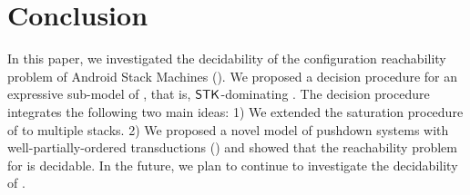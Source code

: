\documentclass[preprint,12pt]{elsarticle}
\begin{document}

\section{Conclusion}
% 
In this paper, we investigated the decidability of the configuration reachability problem of Android Stack Machines (\AMASS). We proposed a decision procedure for an expressive sub-model of {\AMASS}, that is, $\mathsf{STK}$-dominating {\AMASS}. The decision procedure integrates the following two main ideas: 1) We extended the saturation procedure of {\PDS} to multiple stacks. 2) We proposed a novel model of pushdown systems with well-partially-ordered transductions (\WOTrPDS) and showed that the reachability problem for {\WOTrPDS} is decidable.
In the future, we plan to continue to investigate the decidability of {\AMASS}. 

%
 




%

%
%
%
%
%
%
\newpage
% 
\end{document}
